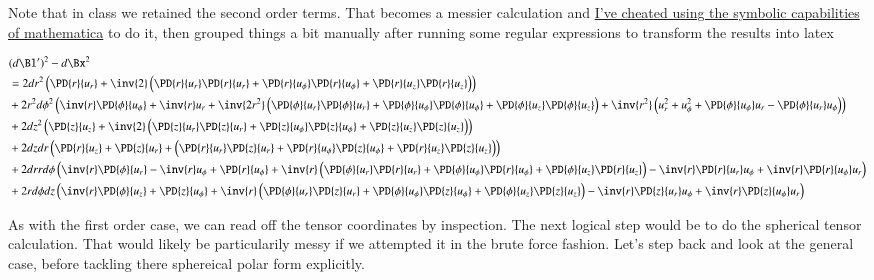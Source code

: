 Note that in class we retained the second order terms.  That becomes a messier calculation and \href{https://github.com/peeterjoot/physicsplay/blob/master/notes/phy454/strainTensorCylindrical.cdf}{I've cheated using the symbolic capabilities of mathematica} to do it, then grouped things a bit manually after running some regular expressions to transform the results into latex

\begin{equation}\label{eqn:continuumL2:490}
\begin{aligned}
&(d\Bl')^2 - d\Bx^2 \\
&= 2 dr^2 \left(
\PD{r}{u_r} 
+ \inv{2} \left(
\PD{r}{u_r} \PD{r}{u_r}
+ 
\PD{r}{u_\phi} \PD{r}{u_\phi}
+ 
\PD{r}{u_z} \PD{r}{u_z}
\right)
\right) \\
& + 2 r^2 d\phi^2 \left(
\inv{r} \PD{\phi}{u_\phi} 
+ \inv{r} u_r 
+
\inv{2 r^2} \left(
  \PD{\phi}{u_r} \PD{\phi}{u_r}
+ \PD{\phi}{u_\phi} \PD{\phi}{u_\phi}
+ \PD{\phi}{u_z} \PD{\phi}{u_z}
\right)
+ \inv{r^2} \left(
u_r^2
+
u_\phi^2 
+
\PD{\phi}{u_\phi} u_r 
- 
\PD{\phi}{u_r} u_\phi 
\right)
\right) \\
&+ 2 dz^2 \left(
  \PD{z}{u_z} 
+ \inv{2} \left( 
  \PD{z}{u_r} \PD{z}{u_r}
+ \PD{z}{u_\phi} \PD{z}{u_\phi}
+ \PD{z}{u_z} \PD{z}{u_z}
\right)
\right) \\
&+ 2 
dz
dr
\left(
  \PD{r}{u_z} 
+ \PD{z}{u_r} 
+ 
\left(
\PD{r}{u_r} \PD{z}{u_r} 
+ \PD{r}{u_\phi} \PD{z}{u_\phi} 
+ \PD{r}{u_z} \PD{z}{u_z}
\right) 
\right) 
\\
&+ 2 
dr
r d\phi 
\left( 
 \inv{r} \PD{\phi}{u_r} 
- \inv{r} u_\phi 
+ \PD{r}{u_\phi} 
+ \inv{r}
\left(
  \PD{\phi}{u_r} \PD{r}{u_r} 
+ \PD{\phi}{u_\phi} \PD{r}{u_\phi} 
+ \PD{\phi}{u_z} \PD{r}{u_z} 
\right)
- \inv{r} \PD{r}{u_r} u_\phi 
+ \inv{r} \PD{r}{u_\phi} u_r 
\right) \\
&+ 2 r d\phi dz \left(
  \inv{r} \PD{\phi}{u_z} 
+ \PD{z}{u_\phi} 
+ \inv{r} 
\left(
  \PD{\phi}{u_r} \PD{z}{u_r} 
+ \PD{\phi}{u_\phi} \PD{z}{u_\phi} 
+ \PD{\phi}{u_z} \PD{z}{u_z} 
\right)
- \inv{r} \PD{z}{u_r} u_\phi 
+ \inv{r} \PD{z}{u_\phi} u_r 
\right) \\
\end{aligned}
\end{equation}

As with the first order case, we can read off the tensor coordinates by inspection.  The next logical step would be to do the spherical tensor calculation.  That would likely be particularily messy if we attempted it in the brute force fashion.  Let's step back and look at the general case, before tackling there sphereical polar form explicitly.

